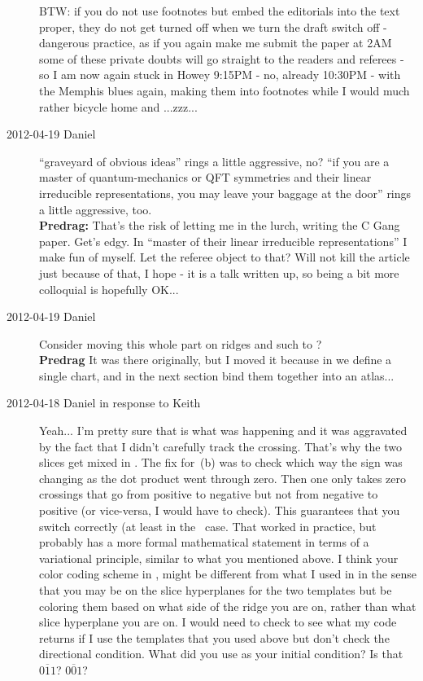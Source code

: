 \begin{description}
    BTW: if you do not use footnotes but embed the editorials
    into the text proper, they do not get turned off when we turn the
    draft switch off - dangerous practice, as if you again make me submit
    the paper at 2AM some of these private doubts will go straight to the
    readers and referees - so I am now again stuck in Howey 9:15PM - no,
    already 10:30PM - with the Memphis blues again, making them into
    footnotes while I would much rather bicycle home and ...zzz...


\item[2012-04-19 Daniel] ``graveyard of obvious ideas'' rings a little
    aggressive, no? ``if you are a master of quantum-mechanics or QFT symmetries
and their linear irreducible representations, you may leave your
baggage at the door'' rings a little aggressive, too.
\\{\bf Predrag:} That's the risk of letting me in the lurch, writing the C
    Gang paper. Get's edgy. In ``master of their linear irreducible
    representations'' I make fun of myself. Let the referee object to
    that? Will not kill the article just because of that, I hope - it is
    a talk written up, so being a bit more colloquial is hopefully OK...

\item[2012-04-19 Daniel] Consider moving this whole part on ridges and such to
    ?
    \\{\bf Predrag} It was there originally, but I moved it because
    in  we define a single chart, and in
    the next section bind them together into an atlas...


\item[2012-04-18 Daniel in response to Keith] Yeah... I'm pretty sure
that is what was happening and it was aggravated by the fact that I
didn't carefully track the crossing. That's why the two slices get mixed
in . The fix for \,(b) was to
check which way the sign was changing as the dot product went through
zero. Then one only takes zero crossings that go from positive to
negative but not from negative to positive (or vice-versa, I would have
to check). This guarantees that you switch correctly (at least in the
\cLe\ case. That worked in practice, but probably has a more formal
mathematical statement in terms of a variational principle, similar to
what you mentioned above. I think your color coding scheme in
, might be different from what I used in
 in the sense that you may be on the slice
hyperplanes for the two templates but be coloring them based on what side
of the ridge you are on, rather than what slice hyperplane you are on. I
would need to check to see what my code returns if I use the templates
that you used above but don't check the directional condition. What did
you use as your initial condition? Is that $\overline{011}$?
$\overline{001}$?


\end{description}
